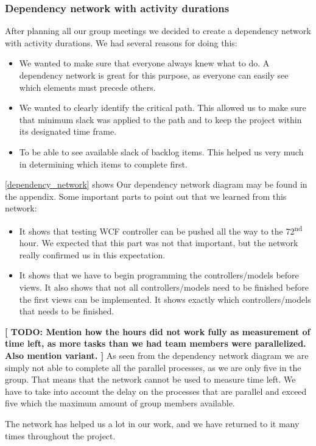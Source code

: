 \subsubsection{Dependency network with activity durations}
After planning all our group meetings we decided to create a dependency network with activity durations. We had several reasons for doing this:

\begin{itemize}
	\item We wanted to make sure that everyone always knew what to do. A dependency network is great for this purpose, as everyone can easily see which elements must precede others.
	\item We wanted to clearly identify the critical path. This allowed us to make sure that minimum slack was applied to the path and to keep the project within its designated time frame.
	\item To be able to see available slack of backlog items. This helped us very much in determining which items to complete first.
\end{itemize}

\cref{dependency_network} shows Our dependency network diagram may be found in the appendix.
Some important parts to point out that we learned from this network:
\begin{itemize}
	\item It shows that testing WCF controller can be pushed all the way to the 72\textsuperscript{nd} hour. We expected that this part was not that important, but the network really confirmed us in this expectation.
	\item It shows that we have to begin programming the controllers/models before views. It also shows that not all controllers/models need to be finished before the first views can be implemented. It shows exactly which controllers/models that needs to be finished.
\end{itemize}

\textbf{[ TODO: Mention how the hours did not work fully as measurement of time left, as more tasks than we had team members were parallelized. Also mention variant. ]}
As seen from the dependency network diagram we are simply not able to complete all the parallel processes, as we are only five in the group. That means that the network cannot be used to measure time left. We have to take into account the delay on the processes that are parallel and exceed five which the maximum amount of group members available.

The network has helped us a lot in our work, and we have returned to it many times throughout the project.